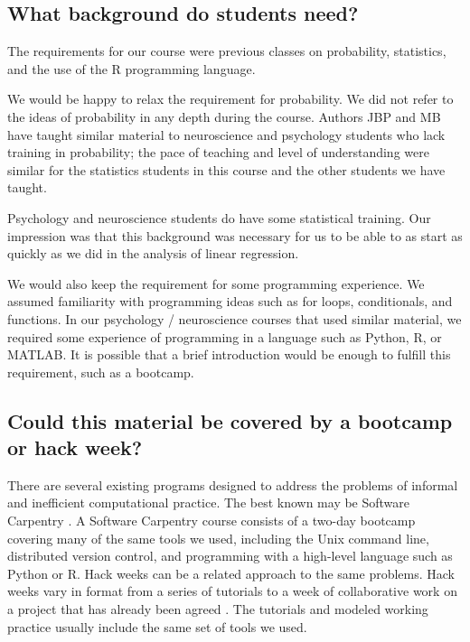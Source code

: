 \subsection{What background do students need?}

The requirements for our course were previous classes on probability,
statistics, and the use of the R programming language.

We would be happy to relax the requirement for probability.  We did not refer
to the ideas of probability in any depth during the course.  Authors JBP and
MB have taught similar material to neuroscience and psychology students who
lack training in probability; the pace of teaching and level of understanding
were similar for the statistics students in this course and the other
students we have taught.

Psychology and neuroscience students do have some statistical training.  Our
impression was that this background was necessary for us to be able to as
start as quickly as we did in the analysis of linear regression.

We would also keep the requirement for some programming experience. We assumed
familiarity with programming ideas such as for loops, conditionals, and
functions.  In our psychology / neuroscience courses that used similar
material, we required some experience of programming in a language such as
Python, R, or MATLAB.  It is possible that a brief introduction would be
enough to fulfill this requirement, such as a bootcamp.

\subsection{Could this material be covered by a bootcamp or hack week?}

There are several existing programs designed to address the problems
of informal and inefficient computational practice.  The best known may be
Software Carpentry \citep{wilson2014software}.  A Software Carpentry course
consists of a two-day bootcamp covering many of the same tools we used,
including the Unix command line, distributed version control, and programming
with a high-level language such as Python or R. Hack weeks can be a related
approach to the same problems. Hack weeks vary in format from a series of
tutorials to a week of collaborative work on a project that has already been
agreed \citep{huppenkothen_hack_2017}.  The tutorials and modeled working
practice usually include the same set of tools we used.

